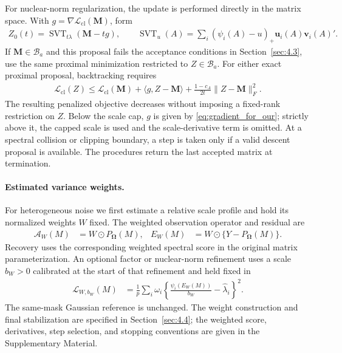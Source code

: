 \documentclass[numsec,webpdf,modern,large,namedate]{oup-authoring-template}
\theoremstyle{plain}
\theoremstyle{remark}
\newcommand{\M}{\bm{M}}
\newcommand{\bOmega}{\bm{\Omega}}
\newcommand{\bu}{\bm{u}}
\newcommand{\bv}{\bm{v}}
\newif\ifmarkchanges
\newenvironment{revision}{\begingroup\ifmarkchanges\color{red}\fi}{\endgroup}
\begin{document}
\begin{revision}
\begin{algorithm}[htbp!]
\end{algorithm}


For nuclear-norm regularization, the update is performed directly in the
matrix space. With $g=\nabla\mathcal L_{\mathrm{cl}}(\M)$, form
\begin{align}
 Z_0(t)=\operatorname{SVT}_{t\lambda}(\M-tg),
 \qquad
 \operatorname{SVT}_{u}(A)=\sum_i(\psi_i(A)-u)_+\bu_i(A)\bv_i(A)'.
 \label{eq:main_nuclear_step}
\end{align}
If $\M\in\mathcal B_a$ and this proposal fails the acceptance conditions
in Section~\ref{sec:4.3}, use the same proximal minimization restricted to
$Z\in\mathcal B_a$. For either exact proximal proposal, backtracking
requires
\begin{align}
 \mathcal L_{\mathrm{cl}}(Z)
 \le\mathcal L_{\mathrm{cl}}(\M)+\langle g,Z-\M\rangle
                  +\frac{1-c_A}{2t}\|Z-\M\|_F^2.
 \label{eq:main_nuclear_backtracking}
\end{align}
The resulting penalized objective decreases without imposing a fixed-rank
restriction on $Z$. Below the scale cap, $g$ is given by
\eqref{eq:gradient_for_our}; strictly above it, the capped scale is used and
the scale-derivative term is omitted. At a spectral collision or clipping
boundary, a step is taken only if a valid descent proposal is available.
The procedures return the last accepted matrix at termination.


\paragraph{Estimated variance weights.}
For heterogeneous noise we first estimate a relative scale profile and
hold its normalized weights $W$ fixed. The weighted observation operator
and residual are
\begin{align*}
 \mathcal A_W(M)&=W\odot P_{\bOmega}(M),&
 E_W(M)&=W\odot\{Y-P_{\bOmega}(M)\}.
\end{align*}
Recovery uses the corresponding weighted spectral score in the original
matrix parameterization. An optional factor or nuclear-norm refinement
uses a scale $b_W>0$ calibrated at the start of that refinement and held
fixed in
\begin{align}
 \mathcal L_{W,b_W}(M)
 &=\frac1p\sum_i\omega_i
   \left\{\frac{\psi_i(E_W(M))}{b_W}-\widehat\lambda_i\right\}^2.
 \label{eq:weighted_fixed_loss}
\end{align}
The same-mask Gaussian reference is unchanged. The weight construction
and final stabilization are specified in Section~\ref{sec:4.4}; the
weighted score, derivatives, step selection, and stopping conventions
are given in the Supplementary Material.
\end{revision}
\end{document}
